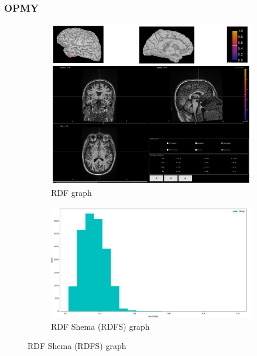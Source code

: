 \documentclass{beamer}
\numberwithin{figure}{section}
\numberwithin{equation}{section}
\begin{document}
\section{}
\begin{frame}
 \frametitle{OPMY}
  

 	\begin{figure}[h]
        \begin{subfigure}[h]{0.53\linewidth} 
            \includegraphics[width=\linewidth]{pictures/OPMY3}
            \caption{\tiny RDF graph}
            \label{fig:rdf_graph}
        \end{subfigure}       
        \begin{subfigure}[h]{0.45\linewidth} 
            \includegraphics[width=\linewidth]{pictures/HISTopmy2}
            \caption{\tiny RDF Shema (RDFS) graph}
            \label{fig:rdfs_graph}
        \end{subfigure}
    \end{figure}

  
\end{frame}
\end{document}
